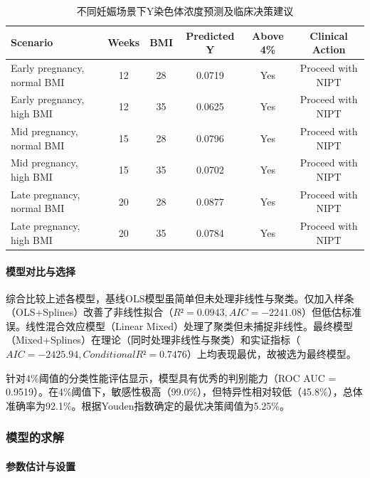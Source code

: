 \documentclass[withoutpreface]{cumcmthesis}
\begin{document}
\begin{table}[htbp]
    \centering
    \caption{不同妊娠场景下Y染色体浓度预测及临床决策建议}
    \label{tab:clinical_scenarios}
    \begin{tabular}{p{4cm}ccccc}
        \toprule
        \textbf{Scenario} & \textbf{Weeks} & \textbf{BMI} & \textbf{Predicted Y} & \textbf{Above 4\%} & \textbf{Clinical Action} \\
        \midrule
        Early pregnancy, normal BMI & 12 & 28 & 0.0719 & Yes & Proceed with NIPT \\
        Early pregnancy, high BMI & 12 & 35 & 0.0625 & Yes & Proceed with NIPT \\
        Mid pregnancy, normal BMI & 15 & 28 & 0.0796 & Yes & Proceed with NIPT \\
        Mid pregnancy, high BMI & 15 & 35 & 0.0702 & Yes & Proceed with NIPT \\
        Late pregnancy, normal BMI & 20 & 28 & 0.0877 & Yes & Proceed with NIPT \\
        Late pregnancy, high BMI & 20 & 35 & 0.0784 & Yes & Proceed with NIPT \\
        \bottomrule
    \end{tabular}
\end{table}

\paragraph{模型对比与选择}

综合比较上述各模型，基线OLS模型虽简单但未处理非线性与聚类。仅加入样条（OLS+Splines）改善了非线性拟合（$R²=0.0943, AIC=-2241.08$）但低估标准误。线性混合效应模型（Linear Mixed）处理了聚类但未捕捉非线性。最终模型（Mixed+Splines）在理论（同时处理非线性与聚类）和实证指标（$AIC=-2425.94, Conditional R²=0.7476$）上均表现最优，故被选为最终模型。

针对4\%阈值的分类性能评估显示，模型具有优秀的判别能力（ROC AUC = 0.9519）。在4\%阈值下，敏感性极高（99.0\%），但特异性相对较低（45.8\%），总体准确率为92.1\%。根据Youden指数确定的最优决策阈值为5.25\%。

\subsubsection{模型的求解}
\paragraph{参数估计与设置}
\end{document}
